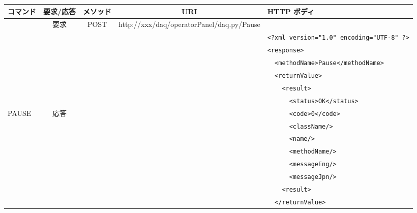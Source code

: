 \documentclass[a4j,10pt,dvips,onecolumn,oneside,final]{jarticle}%
\begin{document}
\begin{table}[htbp]
\begin{center}
{\scriptsize
    \begin{tabular}{|l|c|c|c|l|}\hline
      コマンド    & 要求/応答 & メソッド & URI                      & HTTP ボディ\\ \hline
                  & 要求      & POST & http://xxx/daq/operatorPanel/daq.py/Pause  & \\ \cline{2-5}
                  &           &      &                                            & \verb|<?xml version="1.0" encoding="UTF-8" ?>|\\
                  &           &      &                                            & \verb|<response>|\\ 
                  &           &      &                                            & \verb|  <methodName>Pause</methodName>|\\ 
                  &           &      &                                            & \verb|  <returnValue>|\\ 
                  &           &      &                                            & \verb|    <result>|\\ 
                  &           &      &                                            & \verb|      <status>OK</status>|\\ 
    PAUSE         & 応答      &      &                                            & \verb|      <code>0</code>|\\ 
                  &           &      &                                            & \verb|      <className/>|\\ 
                  &           &      &                                            & \verb|      <name/>|\\ 
                  &           &      &                                            & \verb|      <methodName/>|\\ 
                  &           &      &                                            & \verb|      <messageEng/>|\\ 
                  &           &      &                                            & \verb|      <messageJpn/>|\\ 
                  &           &      &                                            & \verb|    <result>|\\
                  &           &      &                                            & \verb|  </returnValue>|\\ 

\end{tabular}}
\end{center}
\end{table}
\end{document}
